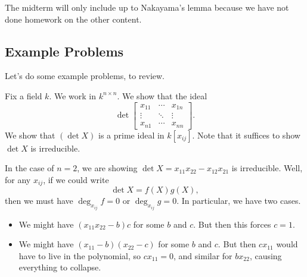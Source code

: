 \begin{remark}
	The midterm will only include up to Nakayama's lemma because we have not done homework on the other content.
\end{remark}

\subsection{Example Problems}
Let's do some example problems, to review.
\begin{exe} \label{exe:det}
	Fix a field $k$. We work in $k^{n\times n}$. We show that the ideal
	\[\det\begin{bmatrix}
		x_{11} & \cdots & x_{1n} \\
		\vdots & \ddots & \vdots \\
		x_{n1} & \cdots & x_{nn}
	\end{bmatrix}.\]
	We show that $(\det X)$ is a prime ideal in $k[x_{ij}]$. Note that it suffices to show $\det X$ is irreducible.
\end{exe}
\begin{ex}
	In the case of $n=2$, we are showing $\det X=x_{11}x_{22}-x_{12}x_{21}$ is irreducible. Well, for any $x_{ij}$, if we could write
	\[\det X=f(X)g(X),\]
	then we must have $\deg_{x_{ij}}f=0$ or $\deg_{x_{ij}}g=0$. In particular, we have two cases.
	\begin{itemize}
		\item We might have $(x_{11}x_{22}-b)c$ for some $b$ and $c$. But then this forces $c=1$.
		\item We might have $(x_{11}-b)(x_{22}-c)$ for some $b$ and $c$. But then $cx_{11}$ would have to live in the polynomial, so $cx_{11}=0$, and similar for $bx_{22}$, causing everything to collapse.
	\end{itemize}
\end{ex}
